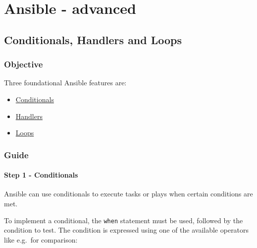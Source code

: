 \chapter{Ansible - advanced}
\hypertarget{conditionals-handlers-and-loops}{%
\section{Conditionals, Handlers and
Loops}\label{conditionals-handlers-and-loops}}


\hypertarget{objective}{%
\subsection{Objective}\label{objective}}

Three foundational Ansible features are:

\begin{itemize}
\tightlist
\item
  \href{https://docs.ansible.com/ansible/latest/user_guide/playbooks_conditionals.html}{Conditionals}
\item
  \href{https://docs.ansible.com/ansible/latest/user_guide/playbooks_intro.html\#handlers-running-operations-on-change}{Handlers}
\item
  \href{https://docs.ansible.com/ansible/latest/user_guide/playbooks_loops.html}{Loops}
\end{itemize}

\hypertarget{guide}{%
\subsection{Guide}\label{guide}}

\hypertarget{step-1---conditionals}{%
\subsubsection{Step 1 - Conditionals}\label{step-1---conditionals}}

Ansible can use conditionals to execute tasks or plays when certain
conditions are met.

To implement a conditional, the \texttt{when} statement must be used,
followed by the condition to test. The condition is expressed using one
of the available operators like e.g.~for comparison:

